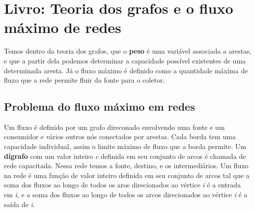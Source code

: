 \documentclass[12pt, a4paper]{paper}
\begin{document}
\section{Livro: Teoria dos grafos e o fluxo máximo de redes} %
\label{sec:Livro: Teoria dos grafos e o fluxo máximo de redes}
Temos dentro da teoria dos grafos, que o \textbf{peso} é uma variável associada a 
arestas, e que a partir dela podemos determinar a capacidade possível existentes de uma 
determinada aresta. Já o fluxo máximo é definido como a quantidade máxima de fluxo que 
a rede permite fluir da fonte para o coletor. 

\subsection{Problema do fluxo máximo em redes} %
\label{sub:Problema do fluxo máximo em redes}
Um fluxo é definido por um grafo direconado envolvendo uma fonte e um consumidor e 
vários outros nós conectados por arestas. Cada borda tem uma capacidade individual, assim
o limite máximo de fluxo que a borda permite. 
Um \textbf{dígrafo} com um valor inteiro \textit{c} definida em seu conjunto de arcos é 
chamada de rede capacitada. Nessa rede temos a fonte, destino, e os intermediários. Um 
fluxo na rede é uma função de valor inteiro definida em seu conjunto de arcos tal que 
a soma dos fluxos ao longo de todos os aros direcionados ao vértice \textit{i} é a 
entrada em \textit{i}, e a soma dos fluxos ao longo de todos os arcos direcionados ao 
vértice \textit{i} é a saída de \textit{i}.




\end{document}
